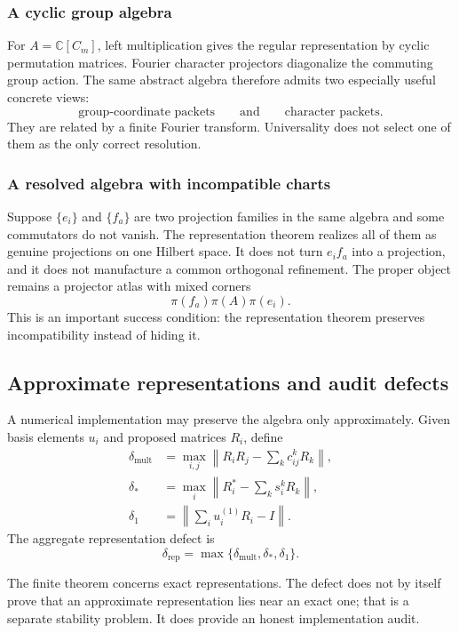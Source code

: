 \documentclass[11pt]{article}
\theoremstyle{definition}
\theoremstyle{remark}
\begin{document}
\subsubsection*{A cyclic group algebra}

For $A=\mathbb C[C_m]$, left multiplication gives the regular representation by cyclic permutation matrices.  Fourier character projectors diagonalize the commuting group action.  The same abstract algebra therefore admits two especially useful concrete views:
\[
\text{group-coordinate packets}
\qquad\text{and}\qquad
\text{character packets}.
\]
They are related by a finite Fourier transform.  Universality does not select one of them as the only correct resolution.

\subsubsection*{A resolved algebra with incompatible charts}

Suppose $\{e_i\}$ and $\{f_a\}$ are two projection families in the same algebra and some commutators do not vanish.  The representation theorem realizes all of them as genuine projections on one Hilbert space.  It does not turn $e_if_a$ into a projection, and it does not manufacture a common orthogonal refinement.  The proper object remains a projector atlas with mixed corners
\[
\pi(f_a)\pi(A)\pi(e_i).
\]
This is an important success condition: the representation theorem preserves incompatibility instead of hiding it.

\subsection{Approximate representations and audit defects}

A numerical implementation may preserve the algebra only approximately.  Given basis elements $u_i$ and proposed matrices $R_i$, define
\begin{align*}
\delta_{\mathrm{mult}}
&=
\max_{i,j}
\left\|
R_iR_j-
\sum_kc_{ij}^kR_k
\right\|,\\
\delta_*
&=
\max_i
\left\|
R_i^*-
\sum_ks_i^kR_k
\right\|,\\
\delta_1
&=
\left\|
\sum_iu_i^{(1)}R_i-I
\right\|.
\end{align*}
The aggregate representation defect is
\[
\delta_{\mathrm{rep}}
=
\max\{\delta_{\mathrm{mult}},\delta_*,\delta_1\}.
\]

The finite theorem concerns exact representations.  The defect does not by itself prove that an approximate representation lies near an exact one; that is a separate stability problem.  It does provide an honest implementation audit.
\end{document}
